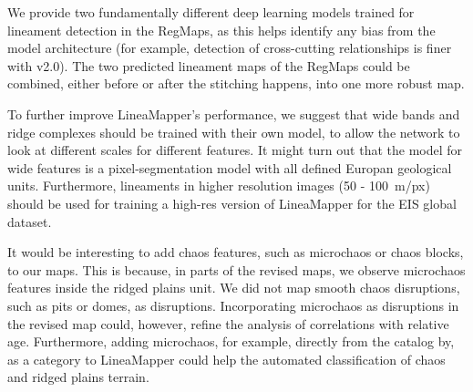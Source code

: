 We provide two fundamentally different deep learning models trained for lineament detection in the RegMaps, as this helps identify any bias from the model architecture (for example, detection of cross-cutting relationships is finer with v2.0). The two predicted lineament maps of the RegMaps could be combined, either before or after the stitching happens, into one more robust map.


To further improve LineaMapper's performance, we suggest that wide bands and ridge complexes should be trained with their own model, to allow the network to look at different scales for different features. It might turn out that the model for wide features is a pixel-segmentation model with all defined Europan geological units.
Furthermore, lineaments in higher resolution images (50 - 100~m/px) should be used for training a high-res version of LineaMapper for the EIS global dataset.

It would be interesting to add chaos features, such as microchaos or chaos blocks, to our maps. This is because, in parts of the revised maps, we observe microchaos features inside the ridged plains unit. We did not map smooth chaos disruptions, such as pits or domes, as disruptions. Incorporating microchaos as disruptions in the revised map could, however, refine the analysis of correlations with relative age. Furthermore, adding microchaos, for example, directly from the catalog by, as a category to LineaMapper could help the automated classification of chaos and ridged plains terrain.



